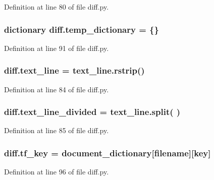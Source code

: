 Definition at line 80 of file diff.\+py.

\subsubsection[{\texorpdfstring{temp\+\_\+dictionary}{temp_dictionary}}]{\setlength{\rightskip}{0pt plus 5cm}dictionary diff.\+temp\+\_\+dictionary = \{\}}\hypertarget{namespacediff_aca04823d91158ba2b053d46e3550516d}{}\label{namespacediff_aca04823d91158ba2b053d46e3550516d}


Definition at line 91 of file diff.\+py.

\subsubsection[{\texorpdfstring{text\+\_\+line}{text_line}}]{\setlength{\rightskip}{0pt plus 5cm}diff.\+text\+\_\+line = text\+\_\+line.\+rstrip()}\hypertarget{namespacediff_afec29e46f49378a5b7b3495eecdb5e55}{}\label{namespacediff_afec29e46f49378a5b7b3495eecdb5e55}


Definition at line 84 of file diff.\+py.

\subsubsection[{\texorpdfstring{text\+\_\+line\+\_\+divided}{text_line_divided}}]{\setlength{\rightskip}{0pt plus 5cm}diff.\+text\+\_\+line\+\_\+divided = text\+\_\+line.\+split(\textquotesingle{} \textquotesingle{})}\hypertarget{namespacediff_ac8b8b94593712a4b907001ab1fa122c7}{}\label{namespacediff_ac8b8b94593712a4b907001ab1fa122c7}


Definition at line 85 of file diff.\+py.

\subsubsection[{\texorpdfstring{tf\+\_\+key}{tf_key}}]{\setlength{\rightskip}{0pt plus 5cm}diff.\+tf\+\_\+key = {\bf document\+\_\+dictionary}\mbox{[}filename\mbox{]}\mbox{[}key\mbox{]}}\hypertarget{namespacediff_ab860e167471d632882c770f12e87927e}{}\label{namespacediff_ab860e167471d632882c770f12e87927e}


Definition at line 96 of file diff.\+py.

